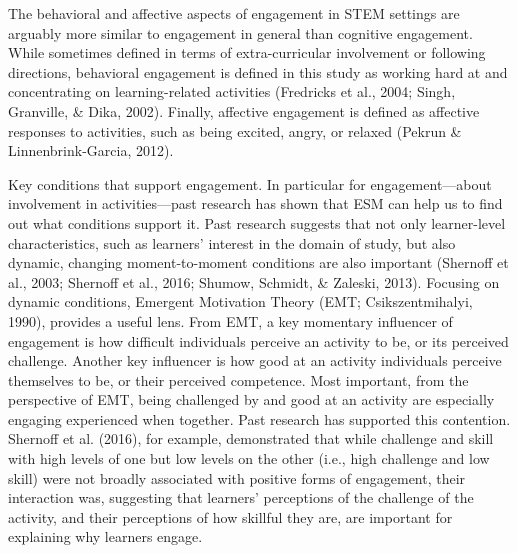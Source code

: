 \documentclass[]{msu-thesis}
\theoremstyle{definition}
\theoremstyle{definition}
\theoremstyle{definition}
\theoremstyle{remark}
\begin{document}
The behavioral and affective aspects of engagement in STEM settings are
arguably more similar to engagement in general than cognitive
engagement. While sometimes defined in terms of extra-curricular
involvement or following directions, behavioral engagement is defined in
this study as working hard at and concentrating on learning-related
activities (Fredricks et al., 2004; Singh, Granville, \& Dika, 2002).
Finally, affective engagement is defined as affective responses to
activities, such as being excited, angry, or relaxed (Pekrun \&
Linnenbrink-Garcia, 2012).

Key conditions that support engagement. In particular for
engagement---about involvement in activities---past research has shown
that ESM can help us to find out what conditions support it. Past
research suggests that not only learner-level characteristics, such as
learners' interest in the domain of study, but also dynamic, changing
moment-to-moment conditions are also important (Shernoff et al., 2003;
Shernoff et al., 2016; Shumow, Schmidt, \& Zaleski, 2013). Focusing on
dynamic conditions, Emergent Motivation Theory (EMT; Csikszentmihalyi,
1990), provides a useful lens. From EMT, a key momentary influencer of
engagement is how difficult individuals perceive an activity to be, or
its perceived challenge. Another key influencer is how good at an
activity individuals perceive themselves to be, or their perceived
competence. Most important, from the perspective of EMT, being
challenged by and good at an activity are especially engaging
experienced when together. Past research has supported this contention.
Shernoff et al. (2016), for example, demonstrated that while challenge
and skill with high levels of one but low levels on the other (i.e.,
high challenge and low skill) were not broadly associated with positive
forms of engagement, their interaction was, suggesting that learners'
perceptions of the challenge of the activity, and their perceptions of
how skillful they are, are important for explaining why learners engage.
\end{document}
